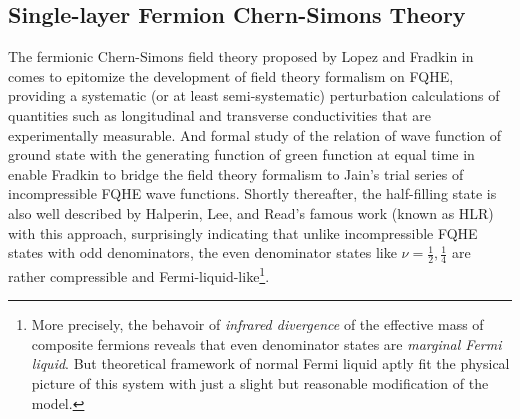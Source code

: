 \documentclass[bachelor,english,numbers]{ustcthesis}
\begin{document}
		\subsection{Single-layer Fermion Chern-Simons Theory}
		\indent\par The fermionic Chern-Simons field theory proposed by Lopez and Fradkin in \cite{lopez1991fractional} comes to epitomize the development of field theory formalism on FQHE, providing a systematic (or at least semi-systematic) perturbation calculations of quantities such as longitudinal and transverse conductivities that are experimentally measurable. And formal study of the relation of wave function of ground state with the generating function of green function at equal time in \cite{fradkin1993wave} enable Fradkin to bridge the field theory formalism to Jain's trial series of incompressible FQHE wave functions. Shortly thereafter, the half-filling state is also well described by Halperin, Lee, and Read's famous work \cite{Halperin1995Theory} (known as HLR) with this approach, surprisingly indicating that unlike incompressible FQHE states with odd denominators, the even denominator states like $\nu=\frac{1}{2},\frac{1}{4}$ are rather compressible and Fermi-liquid-like\footnote{More precisely, the behavoir of \emph{infrared divergence} of the effective mass of composite fermions \cite{stern1995singularities} reveals that even denominator states are \emph{marginal Fermi liquid}. But theoretical framework of normal Fermi liquid aptly fit the physical picture of this system with just a slight but reasonable modification of the model.}.
\end{document}
